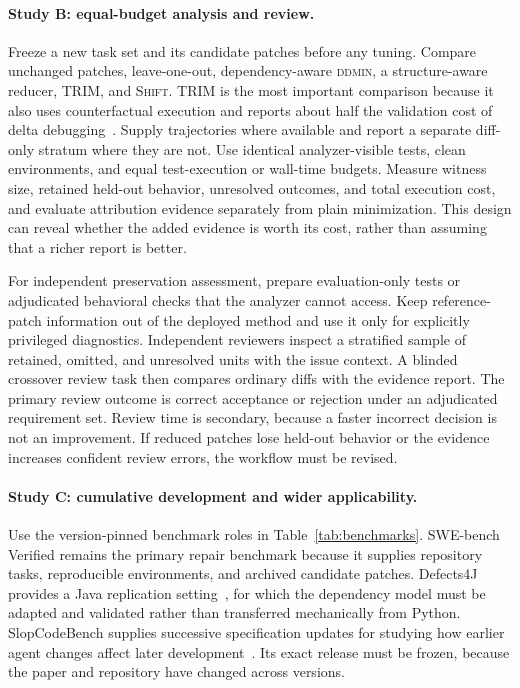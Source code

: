 \documentclass[a4paper,fleqn]{cas-sc}
\newcommand{\tool}{\textsc{Shift}}
\begin{document}
\paragraph{Study B: equal-budget analysis and review.}
Freeze a new task set and its candidate patches before any tuning. Compare unchanged patches, leave-one-out, dependency-aware \textsc{ddmin}, a structure-aware reducer, TRIM, and \tool{}. TRIM is the most important comparison because it also uses counterfactual execution and reports about half the validation cost of delta debugging~\citep{mathai2026trim}. Supply trajectories where available and report a separate diff-only stratum where they are not. Use identical analyzer-visible tests, clean environments, and equal test-execution or wall-time budgets. Measure witness size, retained held-out behavior, unresolved outcomes, and total execution cost, and evaluate attribution evidence separately from plain minimization. This design can reveal whether the added evidence is worth its cost, rather than assuming that a richer report is better.

For independent preservation assessment, prepare evaluation-only tests or adjudicated behavioral checks that the analyzer cannot access. Keep reference-patch information out of the deployed method and use it only for explicitly privileged diagnostics. Independent reviewers inspect a stratified sample of retained, omitted, and unresolved units with the issue context. A blinded crossover review task then compares ordinary diffs with the evidence report. The primary review outcome is correct acceptance or rejection under an adjudicated requirement set. Review time is secondary, because a faster incorrect decision is not an improvement. If reduced patches lose held-out behavior or the evidence increases confident review errors, the workflow must be revised.

\paragraph{Study C: cumulative development and wider applicability.}
Use the version-pinned benchmark roles in Table~\ref{tab:benchmarks}. SWE-bench Verified remains the primary repair benchmark because it supplies repository tasks, reproducible environments, and archived candidate patches. Defects4J provides a Java replication setting~\citep{just2014defects4j}, for which the dependency model must be adapted and validated rather than transferred mechanically from Python. SlopCodeBench supplies successive specification updates for studying how earlier agent changes affect later development~\citep{orlanski2026slopcodebench}. Its exact release must be frozen, because the paper and repository have changed across versions.
\end{document}
